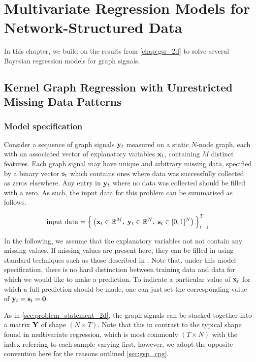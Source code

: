 \chapter{Multivariate Regression Models for Network-Structured Data}


\label{chap:kgr_rnc_2d}

In this chapter, we build on the results from \cref{chap:gsr_2d} to solve several Bayesian regression models for graph signals. 


\section{Kernel Graph Regression with Unrestricted Missing Data Patterns}

\label{sec:kgr_mdp}

\subsection{Model specification}

Consider a sequence of graph signals $\mathbf{y}_t$ measured on a static $N$-node graph, each with an associated vector of explanatory variables $\mathbf{x}_t$, containing $M$ distinct features. Each graph signal may have unique and arbitrary missing data, specified by a binary vector $\mathbf{s}_t$ which contains ones where data was successfully collected as zeros elsewhere. Any entry in $\mathbf{y}_t$ where no data was collected should be filled with a zero. As such, the input data for this problem can be summarised as follows. 

\begin{equation}
    \text{input data} = \Big\{\left(\mathbf{x}_t \in \mathbb{R}^{M}, \; \mathbf{y}_t \in \mathbb{R}^{N}, \; \mathbf{s}_t \in [0, 1]^{N} \right)\Big\}_{t=1}^T
\end{equation}

 In the following, we assume that the explanatory variables not not contain any missing values. If missing values are present here, they can be filled in using standard techniques such as those described in \cite{Little2019}. Note that, under this model specification, there is no hard distinction between training data and data for which we would like to make a prediction. To indicate a particular value of $\mathbf{x}_t$ for which a full prediction should be made, one can just set the corresponding value of $\mathbf{y}_t = \mathbf{s}_t = \mathbf{0}$. 

As in \cref{sec:problem_statement_2d}, the graph signals can be stacked together into a matrix $\mathbf{Y}$ of shape $(N \times T)$. Note that this in contrast to the typical shape found in multivariate regression, which is most commonly $(T \times N)$ with the index referring to each sample varying first, however, we adopt the opposite convention here for the reasons outlined \cref{sec:gsp_cpg}. 

